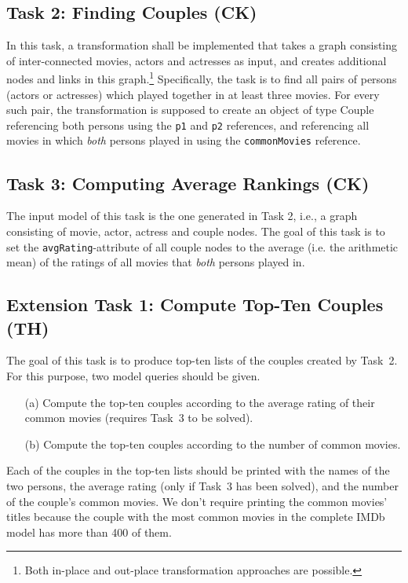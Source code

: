 \documentclass[a4paper,11pt]{article}
\begin{document}
\subsection{Task 2: Finding Couples (CK)}

In this task, a transformation shall be implemented that takes a graph
consisting of inter-connected movies, actors and actresses as input, and
creates additional nodes and links in this graph.\footnote{Both in-place and
  out-place transformation approaches are possible.} Specifically, the task is
to find all pairs of persons (actors or actresses) which played together in at
least three movies.  For every such pair, the transformation is supposed to
create an object of type \textsf{Couple} referencing both persons using the
\verb|p1| and \verb|p2| references, and referencing all movies in which
\emph{both} persons played in using the \verb|commonMovies| reference.


\subsection{Task 3: Computing Average Rankings (CK)}

The input model of this task is the one generated in Task 2,
i.e., a graph consisting of movie, actor, actress and couple
nodes. The goal of this task is to set the \verb|avgRating|-attribute
of all couple nodes to the average (i.e. the
arithmetic mean) of the ratings of all movies that
\emph{both} persons played in.

\subsection{Extension Task 1: Compute Top-Ten Couples (TH)}

The goal of this task is to produce top-ten lists of the couples created by
Task~2.  For this purpose, two model queries should be given.

\begin{enumerate}
\item[(a)] Compute the top-ten couples according to the average rating of their
  common movies (requires Task~3 to be solved).
\item[(b)] Compute the top-ten couples according to the number of common
  movies.
\end{enumerate}

Each of the couples in the top-ten lists should be printed with the names of
the two persons, the average rating (only if Task~3 has been solved), and the
number of the couple's common movies.  We don't require printing the common
movies' titles because the couple with the most common movies in the complete
IMDb model has more than 400 of them.
\end{document}
